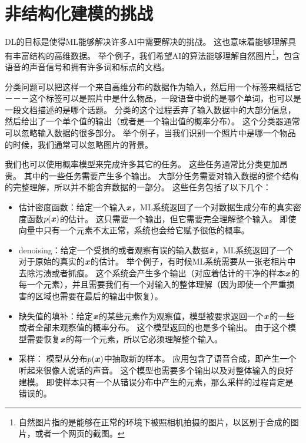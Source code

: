 \section{非结构化建模的挑战}
\label{sec:the_challenge_of_unstructured_modelling}


\gls{DL}的目标是使得\gls{ML}能够解决许多\gls{AI}中需要解决的挑战。
这也意味着能够理解具有丰富结构的高维数据。
举个例子，我们希望\gls{AI}的算法能够理解自然图片\footnote{自然图片指的是能够在正常的环境下被照相机拍摄的图片，以区别于合成的图片，或者一个网页的截图。}，包含语音的声音信号和拥有许多词和标点的文档。


分类问题可以把这样一个来自高维分布的数据作为输入，然后用一个标签来概括它－－－这个标签可以是照片中是什么物品，一段语音中说的是哪个单词，也可以是一段文档描述的是哪个话题。
分类的这个过程丢弃了输入数据中的大部分信息，然后给出了一个单个值的输出（或者是一个输出值的概率分布）。
这个分类器通常可以忽略输入数据的很多部分。
举个例子，当我们识别一个照片中是哪一个物品的时候，我们通常可以忽略图片的背景。


我们也可以使用概率模型来完成许多其它的任务。
这些任务通常比分类更加昂贵。
其中的一些任务需要产生多个输出。
大部分任务需要对输入数据的整个结构的完整理解，所以并不能舍弃数据的一部分。
这些任务包括了以下几个：
\begin{itemize}
	\item 估计密度函数：给定一个输入$\boldsymbol{\mathit{x}}$，\gls{ML}系统返回了一个对数据生成分布的真实密度函数$p(\boldsymbol{\mathit{x}})$的估计。
	这只需要一个输出，但它需要完全理解整个输入。
	即使向量中只有一个元素不太正常，系统也会给它赋予很低的概率。
	
	
	\item \gls{denoising}：给定一个受损的或者观察有误的输入数据$\tilde{\boldsymbol{\mathit{x}}}$，\gls{ML}系统返回了一个对于原始的真实的$\boldsymbol{\mathit{x}}$的估计。
	举个例子，有时候\gls{ML}系统需要从一张老相片中去除污渍或者抓痕。
	这个系统会产生多个输出（对应着估计的干净的样本$\boldsymbol{\mathit{x}}$的每一个元素），并且需要我们有一个对输入的整体理解（因为即使一个严重损害的区域也需要在最后的输出中恢复）。
	
	\item 缺失值的填补：给定$\boldsymbol{\mathit{x}}$的某些元素作为观察值，模型被要求返回一个$\boldsymbol{\mathit{x}}$的一些或者全部未观察值的概率分布。
	这个模型返回的也是多个输出。
	由于这个模型需要恢复$\boldsymbol{\mathit{x}}$的每一个元素，所以它必须理解整个输入。
	
	\item 采样： 模型从分布$p(\boldsymbol{\mathit{x}})$中抽取新的样本。
	应用包含了语音合成，即产生一个听起来很像人说话的声音。
	这个模型也需要多个输出以及对整体输入的良好建模。
	即使样本只有一个从错误分布中产生的元素，那么采样的过程肯定是错误的。 
\end{itemize}

